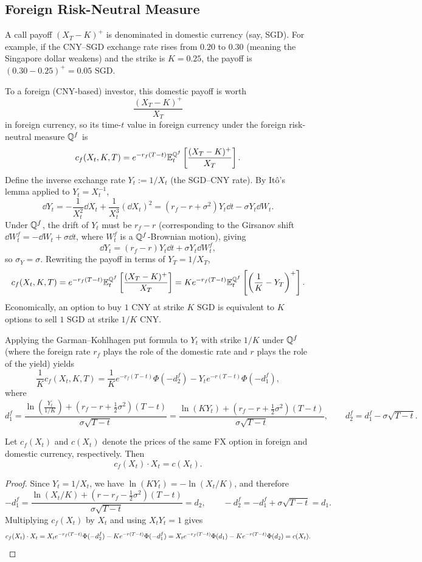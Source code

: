 \subsection*{Foreign Risk-Neutral Measure}

A call payoff $(X_T - K)^+$ is denominated in domestic currency (say, SGD). For example, if the CNY--SGD exchange rate rises from $0.20$ to $0.30$ (meaning the Singapore dollar weakens) and the strike is $K = 0.25$, the payoff is $(0.30 - 0.25)^+ = 0.05\text{ SGD}$.

To a foreign (CNY-based) investor, this domestic payoff is worth
\[
\frac{(X_T - K)^+}{X_T}
\]
in foreign currency, so its time-$t$ value in foreign currency under the foreign risk-neutral measure $\mathbb{Q}^f$ is
\[
c_f(X_t, K, T) = e^{-r_f(T-t)}\mathbb{E}_t^{\mathbb{Q}^f}\left[\frac{(X_T - K)^+}{X_T}\right].
\]
Define the inverse exchange rate $Y_t := 1/X_t$ (the SGD--CNY rate). By It\^{o}'s lemma applied to $Y_t = X_t^{-1}$,
\[
\dd Y_t = -\frac{1}{X_t^2}\dd X_t + \frac{1}{X_t^3}(\dd X_t)^2 = \left(r_f - r + \sigma^2\right)Y_t \dd t - \sigma Y_t \dd W_t.
\]
Under $\mathbb{Q}^f$, the drift of $Y_t$ must be $r_f - r$ (corresponding to the Girsanov shift $\dd W_t^f = -\dd W_t + \sigma \dd t$, where $W_t^f$ is a $\mathbb{Q}^f$-Brownian motion), giving
\[
\dd Y_t = (r_f - r)Y_t \dd t + \sigma Y_t \dd W_t^f,
\]
so $\sigma_Y = \sigma$. Rewriting the payoff in terms of $Y_T = 1/X_T$,
\[
c_f(X_t, K, T) = e^{-r_f(T-t)}\mathbb{E}_t^{\mathbb{Q}^f}\left[\frac{(X_T - K)^+}{X_T}\right] = K e^{-r_f(T-t)}\mathbb{E}_t^{\mathbb{Q}^f}\left[\left(\frac{1}{K} - Y_T\right)^+\right].
\]
Economically, an option to buy $1\text{ CNY}$ at strike $K\text{ SGD}$ is equivalent to $K$ options to sell $1\text{ SGD}$ at strike $1/K\text{ CNY}$.

Applying the Garman--Kohlhagen put formula to $Y_t$ with strike $1/K$ under $\mathbb{Q}^f$ (where the foreign rate $r_f$ plays the role of the domestic rate and $r$ plays the role of the yield) yields
\[
\frac{1}{K} c_f(X_t, K, T) = \frac{1}{K} e^{-r_f(T-t)}\Phi(-d_2^f) - Y_t e^{-r(T-t)}\Phi(-d_1^f),
\]
where
\[
d_1^f = \frac{\ln\left(\frac{Y_t}{1/K}\right) + \left(r_f - r + \frac{1}{2}\sigma^2\right)(T - t)}{\sigma\sqrt{T - t}} = \frac{\ln(K Y_t) + \left(r_f - r + \frac{1}{2}\sigma^2\right)(T - t)}{\sigma\sqrt{T - t}}, \qquad d_2^f = d_1^f - \sigma\sqrt{T - t}.
\]

\begin{theorem}\label{thm:fx-measure-duality}
    Let $c_f(X_t)$ and $c(X_t)$ denote the prices of the same FX option in foreign and domestic currency, respectively. Then
    \[
    c_f(X_t)\cdot X_t = c(X_t).
    \]
\end{theorem}
\begin{proof}
    Since $Y_t = 1/X_t$, we have $\ln(K Y_t) = -\ln(X_t/K)$, and therefore
    \[
    -d_1^f = \frac{\ln(X_t/K) + \left(r - r_f - \frac{1}{2}\sigma^2\right)(T - t)}{\sigma\sqrt{T - t}} = d_2, \qquad -d_2^f = -d_1^f + \sigma\sqrt{T - t} = d_1.
    \]
    Multiplying $c_f(X_t)$ by $X_t$ and using $X_t Y_t = 1$ gives
    \[
    c_f(X_t)\cdot X_t = X_t e^{-r_f(T-t)}\Phi(-d_2^f) - K e^{-r(T-t)}\Phi(-d_1^f) = X_t e^{-r_f(T-t)}\Phi(d_1) - K e^{-r(T-t)}\Phi(d_2) = c(X_t). \qedhere
    \]
\end{proof}

